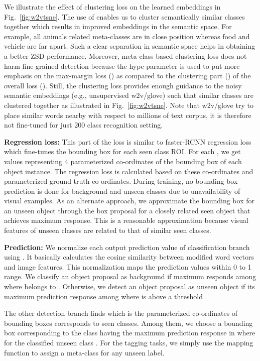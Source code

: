 \documentclass[runningheads]{llncs}
\begin{document}
We illustrate the effect of clustering loss on the learned embeddings in Fig.~\ref{fig:w2vtsne}. The use of  enables us to cluster semantically similar classes together which results in improved embeddings in the semantic space. For example, all animals related meta-classes are in close position whereas food and vehicle are far apart. Such a clear separation in semantic space helps in obtaining a better ZSD performance. Moreover, meta-class based clustering loss does not harm fine-grained detection because the hype-parameter  is used to put more emphasis on the max-margin loss () as compared to the clustering part  () of the overall loss (). Still, the clustering loss provides enough guidance to the noisy semantic embeddings (e.g., unsupervised w2v/glove) such that similar classes are clustered together as illustrated in Fig.~\ref{fig:w2vtsne}. Note that w2v/glove try to place similar words nearby with respect to millions of text corpus, it is therefore not fine-tuned for just 200 class recognition setting.



\textbf{Regression loss:} This part of the loss is similar to faster-RCNN regression loss which fine-tunes the bounding box for each seen class ROI. For each , we get  values representing 4 parameterized co-ordinates of the bounding box of each object instance. The regression loss is calculated based on these co-ordinates and parameterized ground truth co-ordinates. During training, no bounding box prediction is done for background and unseen classes due to unavailability of visual examples. As an alternate approach, we approximate the bounding box for an unseen object through the box proposal for a closely related seen object that achieves maximum response. This is a reasonable approximation because visual features of unseen classes are related to that of similar seen classes. 




\textbf{Prediction:} We normalize each output prediction value of classification branch using
. It basically calculates the cosine similarity between modified word vectors and image features. This normalization maps the prediction values within 0 to 1 range. We classify an object proposal  as background if maximum responds among  where  belongs to . Otherwise, we detect an object proposal as unseen object if its maximum prediction response among  where  is above a threshold .

The other detection branch finds  which is the parameterized co-ordinates of bounding boxes corresponds to  seen classes. Among them, we choose a bounding box corresponding to the class having the maximum prediction response in  where  for the classified unseen class . For the tagging tasks, we simply use the mapping function  to assign a meta-class for any unseen label.
\end{document}
